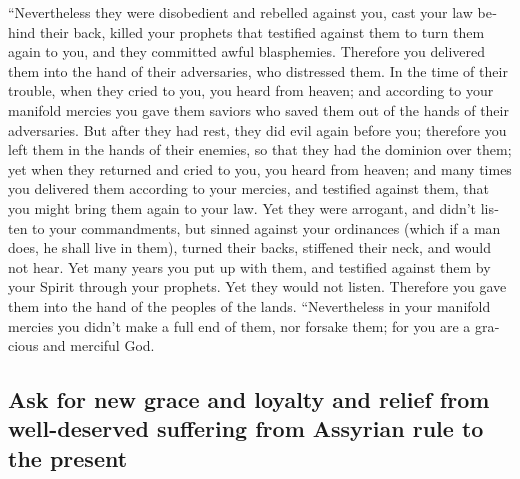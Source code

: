 \begin{paracol}{2}
\begin{otherlanguage}{english}
 ``Nevertheless they were disobedient and rebelled
against you, cast your law behind their back, killed your prophets that
testified against them to turn them again to you, and they committed
awful blasphemies.  Therefore you delivered them into the
hand of their adversaries, who distressed them. In the time of their
trouble, when they cried to you, you heard from heaven; and according to
your manifold mercies you gave them saviors who saved them out of the
hands of their adversaries.  But after they had rest,
they did evil again before you; therefore you left them in the hands of
their enemies, so that they had the dominion over them; yet when they
returned and cried to you, you heard from heaven; and many times you
delivered them according to your mercies,  and testified
against them, that you might bring them again to your law. Yet they were
arrogant, and didn't listen to your commandments, but sinned against
your ordinances (which if a man does, he shall live in them), turned
their backs, stiffened their neck, and would not hear. 
Yet many years you put up with them, and testified against them by your
Spirit through your prophets. Yet they would not listen. Therefore you
gave them into the hand of the peoples of the lands. 
``Nevertheless in your manifold mercies you didn't make a full end of
them, nor forsake them; for you are a gracious and merciful God.

\hypertarget{ask-for-new-grace-and-loyalty-and-relief-from-well-deserved-suffering-from-assyrian-rule-to-the-present}{%
\subsection{Ask for new grace and loyalty and relief from well-deserved
suffering from Assyrian rule to the
present}\label{ask-for-new-grace-and-loyalty-and-relief-from-well-deserved-suffering-from-assyrian-rule-to-the-present}}


\end{otherlanguage}
\end{paracol}

